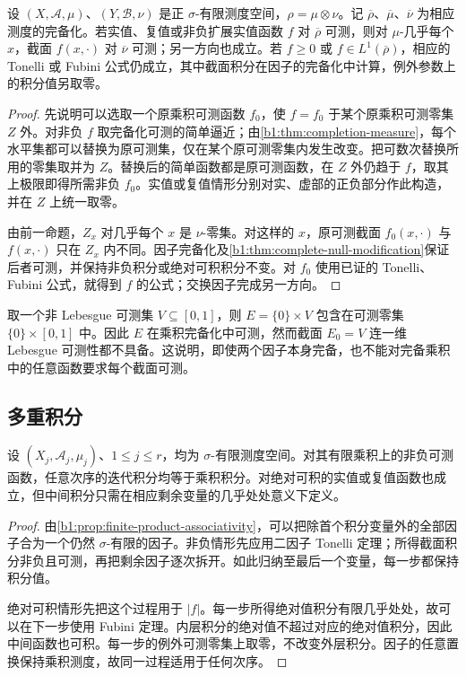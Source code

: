 \begin{proposition}\label{b1:prop:completed-product-sections}
设 \((X,\mathcal A,\mu)\)、\((Y,\mathcal B,\nu)\) 是正 \(\sigma\)-有限测度空间，\(\rho=\mu\otimes\nu\)。记 \(\overline\rho\)、\(\overline\mu\)、\(\overline\nu\) 为相应测度的完备化。若实值、复值或非负扩展实值函数 \(f\) 对 \(\overline\rho\) 可测，则对 \(\mu\)-几乎每个 \(x\)，截面 \(f(x,\cdot)\) 对 \(\overline\nu\) 可测；另一方向也成立。若 \(f\geq0\) 或 \(f\in L^1(\overline\rho)\)，相应的 Tonelli 或 Fubini 公式仍成立，其中截面积分在因子的完备化中计算，例外参数上的积分值另取零。
\end{proposition}
\begin{proof}
先说明可以选取一个原乘积可测函数 \(f_0\)，使 \(f=f_0\) 于某个原乘积可测零集 \(Z\) 外。对非负 \(f\) 取完备化可测的简单逼近；由\cref{b1:thm:completion-measure}，每个水平集都可以替换为原可测集，仅在某个原可测零集内发生改变。把可数次替换所用的零集取并为 \(Z\)。替换后的简单函数都是原可测函数，在 \(Z\) 外仍趋于 \(f\)，取其上极限即得所需非负 \(f_0\)。实值或复值情形分别对实、虚部的正负部分作此构造，并在 \(Z\) 上统一取零。

由前一命题，\(Z_x\) 对几乎每个 \(x\) 是 \(\nu\)-零集。对这样的 \(x\)，原可测截面 \(f_0(x,\cdot)\) 与 \(f(x,\cdot)\) 只在 \(Z_x\) 内不同。因子完备化及\cref{b1:thm:complete-null-modification}保证后者可测，并保持非负积分或绝对可积积分不变。对 \(f_0\) 使用已证的 Tonelli、Fubini 公式，就得到 \(f\) 的公式；交换因子完成另一方向。
\end{proof}

取一个非 Lebesgue 可测集 \(V\subseteq[0,1]\)，则 \(E=\{0\}\times V\) 包含在可测零集 \(\{0\}\times[0,1]\) 中。因此 \(E\) 在乘积完备化中可测，然而截面 \(E_0=V\) 连一维 Lebesgue 可测性都不具备。这说明，即使两个因子本身完备，也不能对完备乘积中的任意函数要求每个截面可测。

\subsection{多重积分}
\label{b1:subsec:070304}

\begin{corollary}\label{b1:cor:multiple-integral-orders}
设 \((X_j,\mathcal A_j,\mu_j)\)、\(1\leq j\leq r\)，均为 \(\sigma\)-有限测度空间。对其有限乘积上的非负可测函数，任意次序的迭代积分均等于乘积积分。对绝对可积的实值或复值函数也成立，但中间积分只需在相应剩余变量的几乎处处意义下定义。
\end{corollary}
\begin{proof}
由\cref{b1:prop:finite-product-associativity}，可以把除首个积分变量外的全部因子合为一个仍然 \(\sigma\)-有限的因子。非负情形先应用二因子 Tonelli 定理；所得截面积分非负且可测，再把剩余因子逐次拆开。如此归纳至最后一个变量，每一步都保持积分值。

绝对可积情形先把这个过程用于 \(|f|\)。每一步所得绝对值积分有限几乎处处，故可以在下一步使用 Fubini 定理。内层积分的绝对值不超过对应的绝对值积分，因此中间函数也可积。每一步的例外可测零集上取零，不改变外层积分。因子的任意置换保持乘积测度，故同一过程适用于任何次序。
\end{proof}

